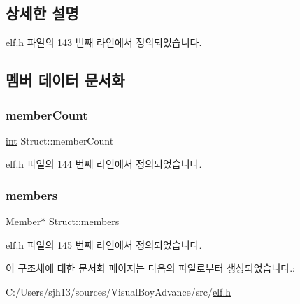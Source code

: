 \subsection{상세한 설명}


elf.\+h 파일의 143 번째 라인에서 정의되었습니다.



\subsection{멤버 데이터 문서화}
\mbox{\label{struct_struct_a3dc20c2c1073675cfd036ae35d63d0ff}} 
\subsubsection{\texorpdfstring{member\+Count}{memberCount}}
{\footnotesize\ttfamily \mbox{\hyperlink{_util_8cpp_a0ef32aa8672df19503a49fab2d0c8071}{int}} Struct\+::member\+Count}



elf.\+h 파일의 144 번째 라인에서 정의되었습니다.

\mbox{\label{struct_struct_aecffaae8752f8d8f85c33d5b05d29d2e}} 
\subsubsection{\texorpdfstring{members}{members}}
{\footnotesize\ttfamily \mbox{\hyperlink{struct_member}{Member}}$\ast$ Struct\+::members}



elf.\+h 파일의 145 번째 라인에서 정의되었습니다.



이 구조체에 대한 문서화 페이지는 다음의 파일로부터 생성되었습니다.\+:\begin{DoxyCompactItemize}
\item 
C\+:/\+Users/sjh13/sources/\+Visual\+Boy\+Advance/src/\mbox{\hyperlink{elf_8h}{elf.\+h}}\end{DoxyCompactItemize}
